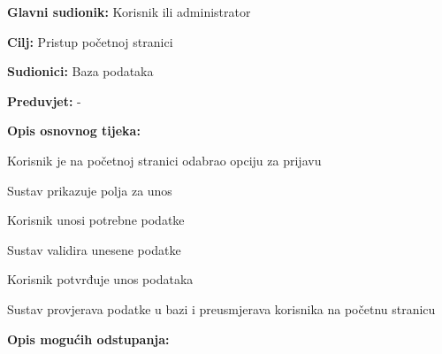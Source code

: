 					\noindent {}
					\begin{packed_item}
	
						\item \textbf{Glavni sudionik: }Korisnik ili administrator
						\item  \textbf{Cilj:} Pristup početnoj stranici
						\item  \textbf{Sudionici:} Baza podataka
						\item  \textbf{Preduvjet:} -

						\item  \textbf{Opis osnovnog tijeka:}
						
						\item[] \begin{packed_enum}
							\item Korisnik je na početnoj stranici odabrao opciju za prijavu
							\item Sustav prikazuje polja za unos
							\item Korisnik unosi potrebne podatke
							\item Sustav validira unesene podatke
							\item Korisnik potvrđuje unos podataka
							\item Sustav provjerava podatke u bazi i preusmjerava korisnika na početnu stranicu
						\end{packed_enum}

						\item  \textbf{Opis mogućih odstupanja:}


\end{packed_item}
